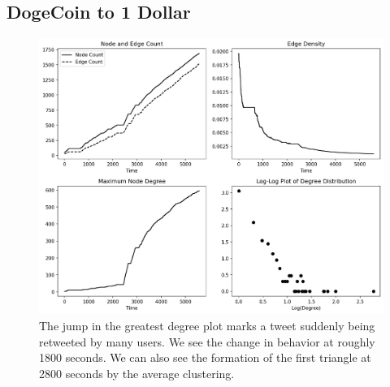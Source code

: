 \documentclass[a4paper,11pt]{article}
\begin{document}
\subsection{DogeCoin to 1 Dollar}
\begin{figure}[h!]
    \includegraphics[width=1.\linewidth]{Images/Doge1Dollar/graph_data.png}
    \centering
    \caption{The jump in the greatest degree plot marks a tweet suddenly being retweeted by many users. We see the change in behavior at roughly 1800 seconds. We can also see the formation of the first triangle at 2800 seconds
    by the average clustering.}
\end{figure}
\end{document}
